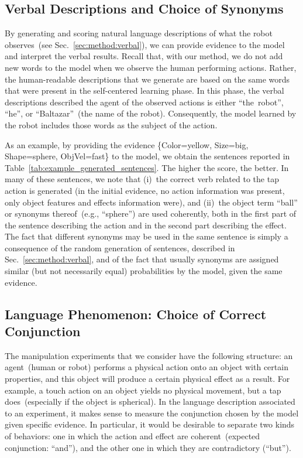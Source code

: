 \subsection{Verbal Descriptions and Choice of Synonyms}
\label{sec:results:verbal_descriptions}

By generating and scoring natural language descriptions of what the robot observes~(see Sec.~\ref{sec:method:verbal}), we can provide evidence to the model and interpret the verbal results.
Recall that, with our method, we do not add new words to the model when we observe the human performing actions.
Rather, the human-readable descriptions that we generate are based on the same words that were present in the self-centered learning phase.
In this phase, the verbal descriptions described the agent of the observed actions is either ``the~robot'', ``he'', or ``Baltazar''~(the name of the robot).
Consequently, the \AffWords{} model learned by the robot includes those words as the subject of the action.

As an example, by providing the evidence \{Color=yellow, Size=big, Shape=sphere, ObjVel=fast\} to the model, we obtain the sentences reported in Table~\ref{tab:example_generated_sentences}.
The higher the score, the better.
In many of these sentences, we note that (i)~the correct verb related to the tap action is generated (in the initial evidence, no action information was present, only object features and effects information were), and (ii)~the object term ``ball'' or synonyms thereof~(e.g., ``sphere'') are used coherently, both in the first part of the sentence describing the action and in the second part describing the effect.
The fact that different synonyms may be used in the same sentence is simply a consequence of the random generation of sentences, described in Sec.~\ref{sec:method:verbal}, and of the fact that usually synonyms are assigned similar (but not necessarily equal) probabilities by the model, given the same evidence.

\subsection{Language Phenomenon: Choice of Correct Conjunction}
\label{sec:results:conjunction}

The manipulation experiments that we consider have the following structure: an agent~(human or robot) performs a physical action onto an object with certain properties, and this object will produce a certain physical effect as a result.
For example, a touch action on an object yields no physical movement, but a tap does~(especially if the object is spherical).
In the language description associated to an experiment, it makes sense to measure the conjunction chosen by the model given specific evidence.
In particular, it would be desirable to separate two kinds of behaviors: one in which the action and effect are coherent~(expected conjunction: ``and''), and the other one in which they are contradictory (``but'').

